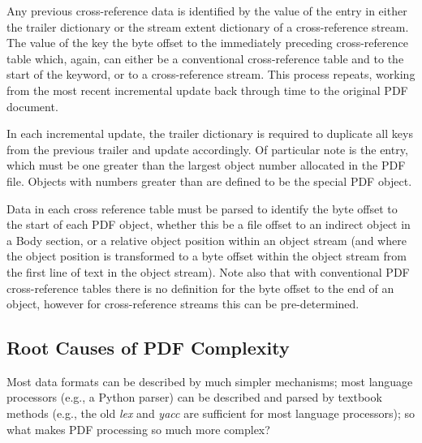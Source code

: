 Any previous cross-reference data is identified by the value of the  entry in either
the trailer dictionary or the stream extent dictionary of a cross-reference stream. The
value of the  key the byte offset to the immediately
preceding cross-reference table which, again, can either be a conventional
cross-reference table and to the start of the  keyword, or to a
cross-reference stream. This process repeats, working from the most recent incremental
update back through time to the original PDF document.

In each incremental update, the trailer dictionary is required to duplicate all keys from the previous
trailer and update accordingly. Of particular note is the  entry, which must be
one greater than the largest object number allocated in the PDF file. Objects with numbers greater
than  are defined to be the special PDF  object.

Data in each cross reference table must be parsed to
identify the byte offset to the start of each PDF object, whether this be a file offset to an indirect object in a Body section, or a relative object position within an object stream (and where the object position is transformed to a byte offset within the object stream from the first line of text in the object stream). Note also that with conventional PDF cross-reference tables there is no definition for the byte offset to the end of an object, however for cross-reference streams this can be pre-determined.


\subsection{Root Causes of PDF Complexity}
\label{sec:rootcause}

Most data formats can be described by much simpler mechanisms;
most language processors (e.g., a Python parser) can be described and parsed by
textbook methods (e.g., the old \emph{lex} and \emph{yacc} are sufficient for
most language processors);
so what makes PDF processing so much more complex?

